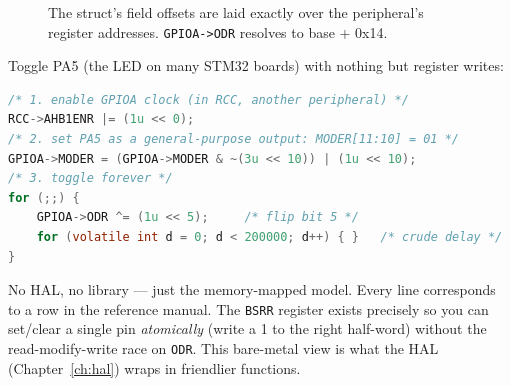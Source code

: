 \documentclass[11pt,a4paper,oneside]{book}
\newcommand{\code}[1]{\texttt{#1}}
\begin{document}
\begin{figure}[h]
\centering
{}
\caption{The struct's field offsets are laid exactly over the peripheral's
register addresses. \code{GPIOA->ODR} resolves to base + 0x14.}
\label{fig:overlay}
\end{figure}

\begin{wexample}
Toggle PA5 (the LED on many STM32 boards) with nothing but register writes:
\begin{lstlisting}[language=C]
/* 1. enable GPIOA clock (in RCC, another peripheral) */
RCC->AHB1ENR |= (1u << 0);
/* 2. set PA5 as a general-purpose output: MODER[11:10] = 01 */
GPIOA->MODER = (GPIOA->MODER & ~(3u << 10)) | (1u << 10);
/* 3. toggle forever */
for (;;) {
    GPIOA->ODR ^= (1u << 5);     /* flip bit 5 */
    for (volatile int d = 0; d < 200000; d++) { }   /* crude delay */
}
\end{lstlisting}
No HAL, no library --- just the memory-mapped model. Every line corresponds to a
row in the reference manual. The \code{BSRR} register exists precisely so you can
set/clear a single pin \emph{atomically} (write a 1 to the right half-word)
without the read-modify-write race on \code{ODR}. This bare-metal view is what
the HAL (Chapter~\ref{ch:hal}) wraps in friendlier functions.
\end{wexample}
\end{document}
